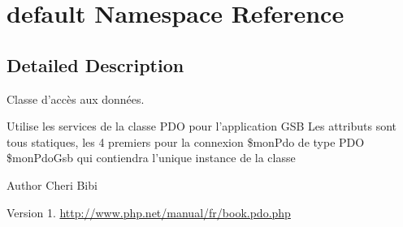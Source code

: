 \hypertarget{namespacedefault}{\section{default Namespace Reference}
\label{namespacedefault}
}


\subsection{Detailed Description}
Classe d'accès aux données.

Utilise les services de la classe P\-D\-O pour l'application G\-S\-B Les attributs sont tous statiques, les 4 premiers pour la connexion \$mon\-Pdo de type P\-D\-O \$mon\-Pdo\-Gsb qui contiendra l'unique instance de la classe

\begin{DoxyAuthor}{Author}
Cheri Bibi 
\end{DoxyAuthor}
\begin{DoxyVersion}{Version}
1. \hyperlink{}{http\-://www.\-php.\-net/manual/fr/book.\-pdo.\-php}
\end{DoxyVersion}
